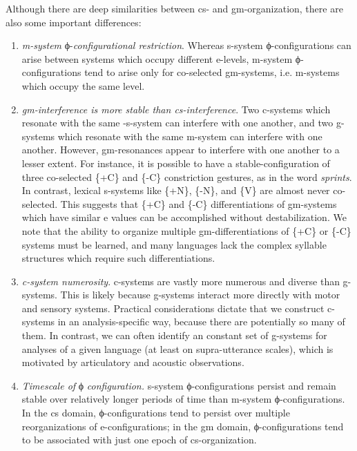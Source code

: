 Although there are deep similarities between cs- and gm-organization, there are also some important differences: 

\begin{enumerate}
\item \textit{m-system} ϕ-\textit{configurational restriction}. Whereas s-system ϕ-configurations can arise between systems which occupy different e-levels, m-system ϕ-configurations tend to arise only for co-selected gm-systems, i.e. m-systems which occupy the same level. 

\item \textit{gm-interference is more stable than cs-interference}. Two c-systems which resonate with the same -s-system can interfere with one another, and two g-systems which resonate with the same m-system can interfere with one another. However, gm-resonances appear to interfere with one another to a lesser extent. For instance, it is possible to have a stable-configuration of three co-selected \{+C\} and \{-C\} constriction gestures, as in the word \textit{sprints}. In contrast, lexical s-systems like \{+N\}, \{-N\}, and \{V\} are almost never co-selected. This suggests that \{+C\} and \{-C\} differentiations of gm-systems which have similar e values can be accomplished without destabilization. We note that the ability to organize multiple gm-differentiations of \{+C\} or \{-C\} systems must be learned, and many languages lack the complex syllable structures which require such differentiations.

\item \textit{c-system numerosity}. c-systems are vastly more numerous and diverse than g-systems. This is likely because g-systems interact more directly with motor and sensory systems. Practical considerations dictate that we construct c-systems in an analysis-specific way, because there are potentially so many of them. In contrast, we can often identify an constant set of g-systems for analyses of a given language (at least on supra-utterance scales), which is motivated  by articulatory and acoustic observations.

\item  \textit{Timescale of} ϕ \textit{configuration.} s-system ϕ-configurations persist and remain stable over relatively longer periods of time than m-system ϕ-configurations. In the cs domain, ϕ-configurations tend to persist over multiple reorganizations of e-configurations; in the gm domain, ϕ-configurations tend to be associated with just one epoch of cs-organization.
\end{enumerate}

